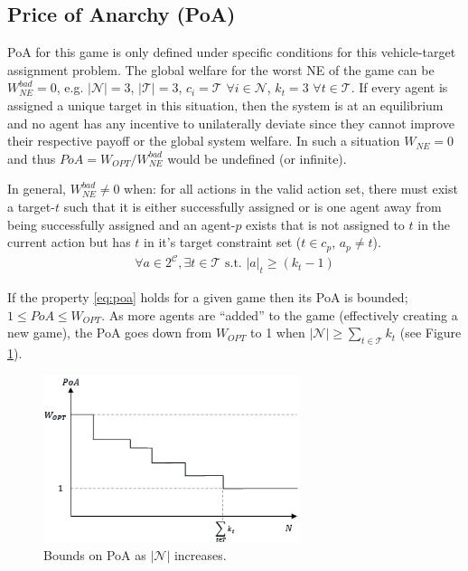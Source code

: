 \documentclass[11pt, onecolumn, compsoc, letterpaper]{article}
\newcommand{\Pl}{\mathcal{N}} %
\newcommand{\Ta}{\mathcal{T}} %
\newcommand{\Co}{\mathcal{C}} %
\begin{document}
\subsection{Price of Anarchy (PoA)}
PoA for this game is only defined under specific conditions for this vehicle-target assignment problem. The global welfare for the worst NE of the game can be $W_{NE}^{bad} = 0$, e.g. $|\Pl| = 3$, $|\Ta| = 3$, $c_i = \Ta$ $\forall i \in \Pl$, $k_t = 3$ $\forall t \in \Ta$. If every agent is assigned a unique target in this situation, then the system is at an equilibrium and no agent has any incentive to unilaterally deviate since they cannot improve their respective payoff or the global system welfare. In such a situation $W_{NE} = 0$ and thus $PoA = W_{OPT} / W_{NE}^{bad}$ would be undefined (or infinite).

In general, $W_{NE}^{bad} \not= 0$ when: for all actions in the valid action set, there must exist a target-$t$ such that it is either successfully assigned or is one agent away from being successfully assigned and an agent-$p$ exists that is not assigned to $t$ in the current action but has $t$ in it's target constraint set ($t \in c_p$, $a_p \not= t$).
\begin{align}
	\forall a \in 2^\Co, \exists t \in \Ta \text{ s.t. } |a|_t \geq (k_t - 1)\label{eq:poa}
\end{align}

If the property \eqref{eq:poa} holds for a given game then its PoA is bounded; $1 \leq PoA \leq W_{OPT}$. As more agents are ``added'' to the game (effectively creating a new game), the PoA goes down from $W_{OPT}$ to 1 when $|\Pl| \geq \sum\limits_{t \in \Ta} k_t$ (see Figure \ref{fig:poa}).

\begin{figure}[!htb]
	\centering\includegraphics[width=7.5cm]{assets/poa.png}
	\centering\caption{Bounds on PoA as $|\Pl|$ increases.}\label{fig:poa}
\end{figure}
\end{document}
